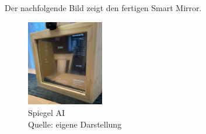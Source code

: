 Der nachfolgende Bild zeigt den fertigen Smart Mirror.
\begin{figure}[h]
    \centering
    \includegraphics[width=0.3\textwidth]{pictures/Spiegel_AI.jpg}
  \captionsetup{justification=centering, labelformat=simple, singlelinecheck=false}
    \caption[Spiegel AI]{Spiegel AI\\ Quelle: eigene Darstellung}
\end{figure}